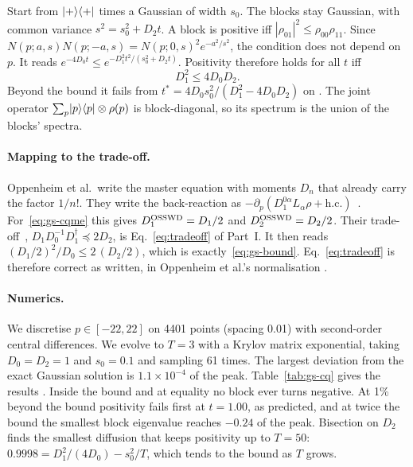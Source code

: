 Start from $\lvert +\rangle\langle +\rvert$ times a Gaussian of width $s_0$. The blocks stay Gaussian, with common variance $s^2=s_0^2+D_2t$. A block is positive
iff $|\rho_{01}|^2\le\rho_{00}\rho_{11}$. Since $N(p;a,s)N(p;-a,s)=N(p;0,s)^2e^{-a^2/s^2}$, the condition does not depend on $p$. It reads
$e^{-4D_0t}\le e^{-D_1^2t^2/(s_0^2+D_2t)}$. Positivity therefore holds for all $t$ iff
\begin{equation}\label{eq:gs-bound}
D_1^2\le4D_0D_2 .
\end{equation}
Beyond the bound it fails from $t^*=4D_0s_0^2/(D_1^2-4D_0D_2)$ on \tagP. The joint operator $\sum_p\lvert p\rangle\langle p\rvert\otimes\rho(p)$ is
block-diagonal, so its spectrum is the union of the blocks' spectra.

\paragraph{Mapping to the trade-off.} Oppenheim et al.\ write the master equation with moments $D_n$ that already carry the factor $1/n!$.
They write the back-reaction as $-\partial_p(D_1^{0\alpha}L_\alpha\rho+\text{h.c.})$~\cite[Eq.~(9)]{osswd}. For~\eqref{eq:gs-cqme} this gives
$D_1^{\rm OSSWD}=D_1/2$ and $D_2^{\rm OSSWD}=D_2/2$. Their trade-off~\cite[Eq.~(23)]{osswd}, $D_1D_0^{-1}D_1^\dagger\preceq2D_2$, is
Eq.~\eqref{eq:tradeoff} of Part~I. It then reads $(D_1/2)^2/D_0\le2\,(D_2/2)$, which is exactly~\eqref{eq:gs-bound}. Eq.~\eqref{eq:tradeoff} is
therefore correct as written, in Oppenheim et al.'s normalisation .

\paragraph{Numerics.} We discretise $p\in[-22,22]$ on 4401 points (spacing 0.01) with second-order central differences. We evolve to $T=3$
with a Krylov matrix exponential, taking $D_0=D_2=1$ and $s_0=0.1$ and sampling 61 times. The largest deviation from the exact Gaussian
solution is $1.1\times10^{-4}$ of the peak. Table~\ref{tab:gs-cq} gives the results . Inside the bound and at equality no block ever turns negative. At 1\% beyond the
bound positivity fails first at $t=1.00$, as predicted, and at twice the bound the smallest block eigenvalue reaches $-0.24$ of the peak.
Bisection on $D_2$ finds the smallest diffusion that keeps positivity up to $T=50$: $0.9998=D_1^2/(4D_0)-s_0^2/T$, which tends to the bound
as $T$ grows.

